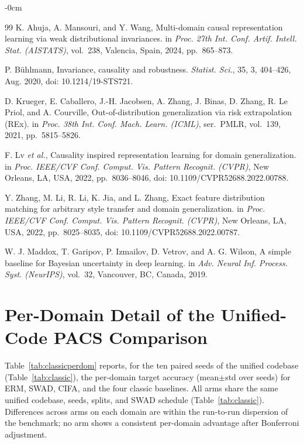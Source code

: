 \documentclass[electronics,article,submit,moreauthors]{Definitions/mdpi}
\begin{document}
\begin{adjustwidth}{-\extralength}{0cm}
\begin{thebibliography}{99}
K. Ahuja, A. Mansouri, and Y. Wang, Multi-domain causal representation learning via weak distributional invariances. in \emph{Proc. 27th Int. Conf. Artif. Intell. Stat. (AISTATS)}, vol.~238, Valencia, Spain, 2024, pp.~865--873.


P. B\"uhlmann, Invariance, causality and robustness. \emph{Statist. Sci.}, 35, 3, 404--426, Aug. 2020, doi: 10.1214/19-STS721.


D. Krueger, E. Caballero, J.-H. Jacobsen, A. Zhang, J. Binas, D. Zhang, R. Le Priol, and A. Courville, Out-of-distribution generalization via risk extrapolation (REx). in \emph{Proc. 38th Int. Conf. Mach. Learn. (ICML)}, ser.~PMLR, vol.~139, 2021, pp.~5815--5826.


F. Lv \emph{et al.}, Causality inspired representation learning for domain generalization. in \emph{Proc. IEEE/CVF Conf. Comput. Vis. Pattern Recognit. (CVPR)}, New Orleans, LA, USA, 2022, pp.~8036--8046, doi: 10.1109/CVPR52688.2022.00788.


Y. Zhang, M. Li, R. Li, K. Jia, and L. Zhang, Exact feature distribution matching for arbitrary style transfer and domain generalization. in \emph{Proc. IEEE/CVF Conf. Comput. Vis. Pattern Recognit. (CVPR)}, New Orleans, LA, USA, 2022, pp.~8025--8035, doi: 10.1109/CVPR52688.2022.00787.


W. J. Maddox, T. Garipov, P. Izmailov, D. Vetrov, and A. G. Wilson, A simple baseline for Bayesian uncertainty in deep learning. in \emph{Adv. Neural Inf. Process. Syst. (NeurIPS)}, vol.~32, Vancouver, BC, Canada, 2019.

\end{thebibliography}

\appendixstart
\appendix
\section{Per-Domain Detail of the Unified-Code PACS Comparison}

Table~\ref{tab:classicperdom} reports, for the ten paired seeds of the unified codebase (Table~\ref{tab:classic}), the per-domain target accuracy (mean$\pm$std over seeds) for ERM, SWAD, CIFA, and the four classic baselines. All arms share the same unified codebase, seeds, splits, and SWAD schedule (Table~\ref{tab:classic}). Differences across arms on each domain are within the run-to-run dispersion of the benchmark; no arm shows a consistent per-domain advantage after Bonferroni adjustment.


\end{adjustwidth}
\end{document}
